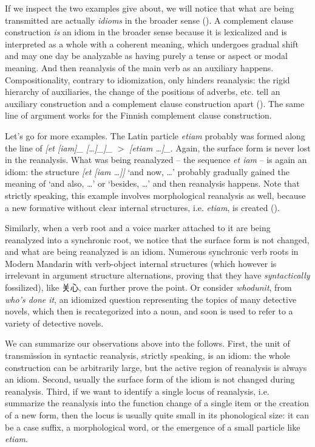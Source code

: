 \documentclass[a4paper, oneside, scheme=plain, 12pt]{article}
\newcommand{\form}[1]{\emph{#1}}
\newcommand*{\textgt}{$>$ }
\newcommand{\translate}[1]{`#1'}
\begin{document}
If we inspect the two examples give about, we will notice that 
what are being transmitted are actually \emph{idioms} in the broader sense ().
A complement clause construction \emph{is} an idiom in the broader sense
because it is lexicalized and is interpreted as a whole with a coherent meaning,
which undergoes gradual shift and may one day be analyzable as having purely a tense or aspect or modal meaning.
And then reanalysis of the main verb as an auxiliary happens.
Compositionality, contrary to idiomization, only hinders reanalysis:
the rigid hierarchy of auxiliaries, the change of the positions of adverbs, etc.
tell an auxiliary construction and a complement clause construction apart
().
The same line of argument works for the Finnish complement clause construction.

Let's go for more examples.
The Latin particle \form{etiam} probably was formed along the line of 
\form{[et [iam]_{} [\dots]_{}]_{\text{coordinate clause}}} 
\textgt \form{[etiam \dots]_{}}.
Again, the surface form is never lost in the reanalysis.
What was being reanalyzed -- the sequence \form{et iam} -- is again an idiom:
the structure \form{[et [iam \dots]]} \translate{and now, \dots}
probably gradually gained the meaning of \translate{and also, \dots} or \translate{besides, \dots}
and then reanalysis happens.
Note that strictly speaking, this example involves morphological reanalysis as well,
because a new formative without clear internal structures, i.e. \form{etiam}, is created
().

Similarly, when a verb root and a voice marker attached to it are being
reanalyzed into a synchronic root,
we notice that the surface form is not changed,
and what are being reanalyzed is an idiom.
Numerous synchronic verb roots in Modern Mandarin with verb-object internal structures
(which however is irrelevant in argument structure alternations,
proving that they have \emph{syntactically} fossilized),
like 关心, can further prove the point.
Or consider \form{whodunit}, from \form{who's done it},
an idiomized question representing the topics of many detective novels,
which then is recategorized into a noun,
and soon is used to refer to a variety of detective novels.

We can summarize our observations above into the follows.
First, the unit of transmission in syntactic reanalysis,
strictly speaking, is an idiom:
the whole construction can be arbitrarily large,
but the active region of reanalysis is always an idiom.
Second, usually the surface form of the idiom is not changed during reanalysis.
Third, if we want to identify a single locus of reanalysis,
i.e. summarize the reanalysis into the function change of a single item
or the creation of a new form,
then the locus is usually quite small in its phonological size:
it can be a case suffix, a morphological word, or the emergence of a small particle like \form{etiam}.
\end{document}

